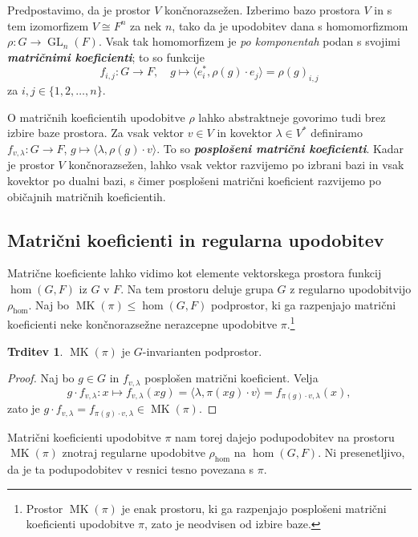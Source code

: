 \documentclass[11pt]{book}
\DeclareMathOperator\MK{MK}
\DeclareMathOperator\GL{GL}
\def\definicija{\color{rdeca}\bf\em}
\theoremstyle{definition}
\theoremstyle{zgled}
\theoremstyle{odprtproblem}
\theoremstyle{domacanaloga}
\newenvironment{dokaz}
    {\color{siva}\begin{proof}}
    {\end{proof}}
\theoremstyle{izrek}
\newtheorem*{trditev}{Trditev}
\begin{document}
Predpostavimo, da je prostor $V$ končnorazsežen. Izberimo bazo prostora $V$ in s tem izomorfizem $V \cong F^n$ za nek $n$, tako da je upodobitev dana s homomorfizmom $\rho \colon G \to \GL_n(F)$. Vsak tak homomorfizem je \emph{po komponentah} podan s svojimi {\definicija matričnimi koeficienti}; to so funkcije
\[
    f_{i,j} \colon G \to F, \quad
    g \mapsto \langle e_i^*, \rho(g) \cdot e_j \rangle = \rho(g)_{i,j}
\]
za $i,j \in \{ 1, 2, \dots, n \}$. 

O matričnih koeficientih upodobitve $\rho$ lahko abstraktneje govorimo tudi brez izbire baze prostora. Za vsak vektor $v \in V$ in kovektor $\lambda \in V^*$ definiramo $f_{v, \lambda} \colon G \to F$, $g \mapsto \langle \lambda, \rho(g) \cdot v \rangle$. To so {\definicija posplošeni matrični koeficienti}. Kadar je prostor $V$ končnorazsežen, lahko vsak vektor razvijemo po izbrani bazi in vsak kovektor po dualni bazi, s čimer posplošeni matrični koeficient razvijemo po običajnih matričnih koeficientih.

\subsection{Matrični koeficienti in regularna upodobitev}

Matrične koeficiente lahko vidimo kot elemente vektorskega prostora funkcij $\hom(G,F)$ iz $G$ v $F$. Na tem prostoru deluje grupa $G$ z regularno upodobitvijo $\rho_{\hom}$. Naj bo $\MK(\pi) \leq \hom(G,F)$ podprostor, ki ga razpenjajo matrični koeficienti neke končnorazsežne nerazcepne upodobitve $\pi$.\footnote{Prostor $\MK(\pi)$ je enak prostoru, ki ga razpenjajo posplošeni matrični koeficienti upodobitve $\pi$, zato je neodvisen od izbire baze.}

\begin{trditev}
$\MK(\pi)$ je $G$-invarianten podprostor.
\end{trditev}
\begin{dokaz}
Naj bo $g \in G$ in $f_{v, \lambda}$ posplošen matrični koeficient. Velja
\[
    g \cdot f_{v, \lambda} \colon x \mapsto f_{v, \lambda}(xg) =
    \langle \lambda, \pi(xg) \cdot v \rangle =
    f_{\pi(g) \cdot v, \lambda}(x),
\]
zato je $g \cdot f_{v, \lambda} = f_{\pi(g) \cdot v, \lambda} \in \MK(\pi)$.
\end{dokaz}

Matrični koeficienti upodobitve $\pi$ nam torej dajejo podupodobitev na prostoru $\MK(\pi)$ znotraj regularne upodobitve $\rho_{\hom}$ na $\hom(G,F)$. Ni presenetljivo, da je ta podupodobitev v resnici tesno povezana s $\pi$.
\end{document}
